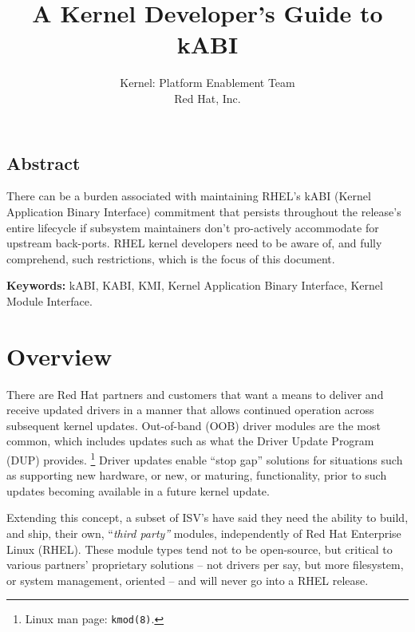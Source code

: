 \documentclass[10pt,oneside,english]{book}
\begin{document}
\title{A Kernel Developer's Guide to kABI}

\author{Kernel: Platform Enablement Team\\
 Red Hat, Inc.}
\maketitle

\newlength{\mpwidth}
\setlength{\mpwidth}{1\columnwidth - 2\fboxsep - 2\fboxrule - \shadowsize}

\section*{Abstract}

There can be a burden associated with maintaining RHEL's kABI (Kernel
Application Binary Interface) commitment that persists throughout
the release's entire lifecycle if subsystem maintainers don't pro-actively
accommodate for upstream back-ports. RHEL kernel developers need to
be aware of, and fully comprehend, such restrictions, which is the
focus of this document.

\textbf{Keywords:} kABI, KABI, KMI, Kernel Application Binary Interface,
Kernel Module Interface.

\tableofcontents{}

\chapter{Overview}

There are Red Hat partners and customers that want a means to deliver
and receive updated drivers in a manner that allows continued operation
across subsequent kernel updates. Out-of-band (OOB) driver modules
are the most common, which includes updates such as what the Driver
Update Program (DUP) provides. \footnote{Linux man page: \texttt{kmod(8)}.}
Driver updates enable ``stop gap'' solutions for situations such
as supporting new hardware, or new, or maturing, functionality, prior
to such updates becoming available in a future kernel update.

Extending this concept, a subset of ISV's have said they need the
ability to build, and ship, their own, ``\emph{third party'' }modules,
independently of Red Hat Enterprise Linux (RHEL). These module types
tend not to be open-source, but critical to various partners' proprietary
solutions -- not drivers per say, but more filesystem, or system
management, oriented -- and will never go into a RHEL release.
\end{document}
